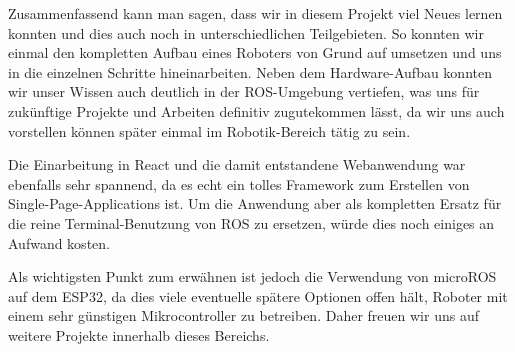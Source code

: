 \begin{flushleft}
    Zusammenfassend kann man sagen, dass wir in diesem Projekt viel Neues lernen konnten und dies auch noch in unterschiedlichen Teilgebieten.
    So konnten wir einmal den kompletten Aufbau eines Roboters von Grund auf umsetzen und uns in die einzelnen Schritte hineinarbeiten. 
    Neben dem Hardware-Aufbau konnten wir unser Wissen auch deutlich in der ROS-Umgebung vertiefen, was uns für zukünftige Projekte und Arbeiten definitiv zugutekommen lässt, da wir uns auch vorstellen können später einmal im Robotik-Bereich tätig zu sein.

    Die Einarbeitung in React und die damit entstandene Webanwendung war ebenfalls sehr spannend, da es echt ein tolles Framework zum Erstellen von Single-Page-Applications ist.    
    Um die Anwendung aber als kompletten Ersatz für die reine Terminal-Benutzung von ROS zu ersetzen, würde dies noch einiges an Aufwand kosten.

    Als wichtigsten Punkt zum erwähnen ist jedoch die Verwendung von microROS auf dem ESP32, da dies viele eventuelle spätere Optionen offen hält, Roboter mit einem sehr günstigen Mikrocontroller zu betreiben.
    Daher freuen wir uns auf weitere Projekte innerhalb dieses Bereichs.
\end{flushleft}